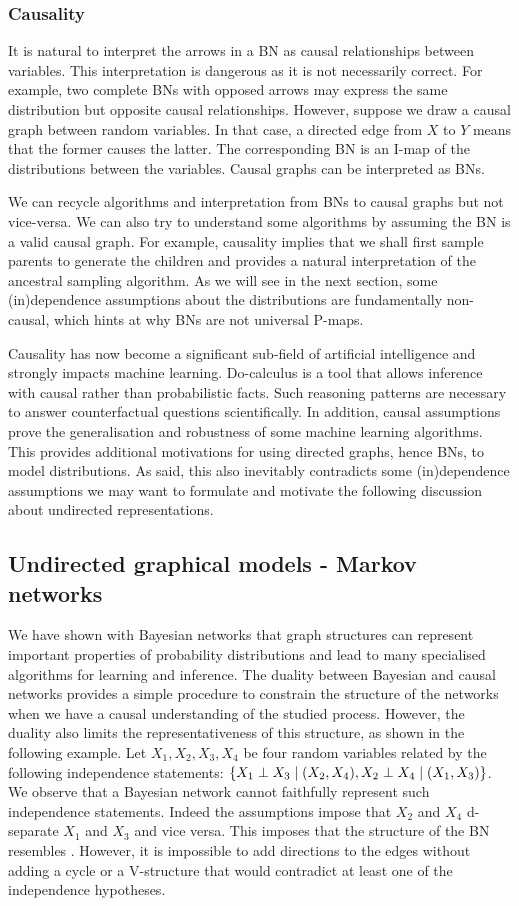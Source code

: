 \subsubsection{Causality}
It is natural to interpret the arrows in a BN as causal relationships between variables. This interpretation is dangerous as it is not necessarily correct. For example, two complete BNs with opposed arrows may express the same distribution but opposite causal relationships. However, suppose we draw a causal graph between random variables. In that case, a directed edge from $X$ to $Y$ means that the former causes the latter. The corresponding BN is an I-map of the distributions between the variables. Causal graphs can be interpreted as BNs.

We can recycle algorithms and interpretation from BNs to causal graphs but not vice-versa. We can also try to understand some algorithms by assuming the BN is a valid causal graph. For example, causality implies that we shall first sample parents to generate the children and provides a natural interpretation of the ancestral sampling algorithm. As we will see in the next section, some (in)dependence assumptions about the distributions are fundamentally non-causal, which hints at why BNs are not universal P-maps.

Causality has now become a significant sub-field of artificial intelligence and strongly impacts machine learning. Do-calculus \citep{pearl1994probabilistic} is a tool that allows inference with causal rather than probabilistic facts. Such reasoning patterns are necessary to answer counterfactual questions scientifically. In addition, causal assumptions prove the generalisation and robustness of some machine learning algorithms. This provides additional motivations for using directed graphs, hence BNs, to model distributions. As said, this also inevitably contradicts some (in)dependence assumptions we may want to formulate and motivate the following discussion about undirected representations.
\subsection{Undirected graphical models - Markov networks}
We have shown with Bayesian networks that graph structures can represent important properties of probability distributions and lead to many specialised algorithms for learning and inference. The duality between Bayesian and causal networks provides a simple procedure to constrain the structure of the networks when we have a causal understanding of the studied process. However, the duality also limits the representativeness of this structure, as shown in the following example. Let $X_1, X_2, X_3, X_4$ be four random variables related by the following independence statements: $\{ X_1 \perp X_3 \mid (X_2, X_4), X_2 \perp X_4 \mid (X_1, X_3)\}$. We observe that a Bayesian network cannot faithfully represent such independence statements. Indeed the assumptions impose that $X_2$ and $X_4$ d-separate $X_1$ and $X_3$ and vice versa. This imposes that the structure of the BN resembles . However, it is impossible to add directions to the edges without adding a cycle or a V-structure that would contradict at least one of the independence hypotheses.

